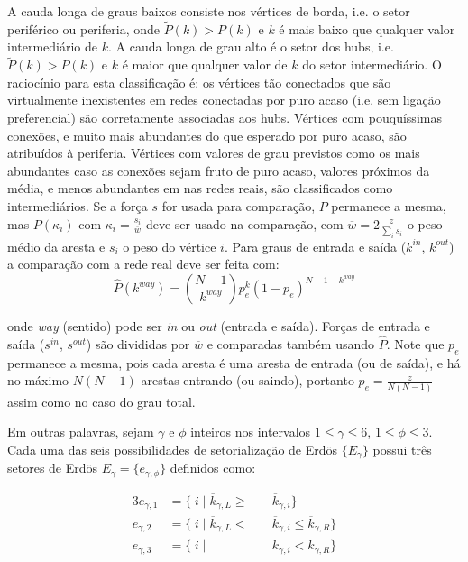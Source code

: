 \documentclass[a4paper,openright,12pt]{report} %
\begin{document}
A cauda longa de graus baixos consiste nos vértices de borda,
i.e. o setor periférico ou periferia, onde
$\widetilde{P}(k)>P(k)$ e $k$ é mais baixo
que qualquer valor intermediário de $k$.
A cauda longa de grau alto é o setor dos hubs,
i.e.
$\widetilde{P}(k)>P(k)$ e $k$ é maior que qualquer valor de $k$ do setor
intermediário.
O raciocínio para esta classificação é: os vértices tão conectados
que são virtualmente inexistentes em redes conectadas por puro acaso
(i.e. sem ligação preferencial) são corretamente associadas
aos hubs.
Vértices com pouquíssimas conexões, e muito mais abundantes do que esperado
por puro acaso, são atribuídos à periferia.
Vértices com valores de grau previstos como os mais abundantes caso
as conexões sejam fruto de puro acaso, valores próximos da média,
e menos abundantes em nas redes reais, são classificados como intermediários.
Se a força $s$ for usada para comparação, $P$ permanece a mesma, mas
$P(\kappa_i)$ com $\kappa_i=\frac{s_i}{\overline{w}}$
deve ser usado na comparação, com
$\overline{w}=2\frac{z}{\sum_is_i}$
o peso médio da aresta e $s_i$ o peso do vértice $i$.
Para graus de entrada e saída
($k^{in}$, $k^{out}$)
a comparação com a rede real deve ser feita com:
\begin{equation}
    \hat{P}(k^{way})=\binom{N-1}{k^{way}}p_e^k(1-p_e)^{N-1-k^{way}}
\end{equation}

\noindent onde \emph{way} (sentido) pode ser \emph{in} ou \emph{out} (entrada e saída).
Forças de entrada e saída ($s^{in}$, $s^{out}$)
são divididas por
$\overline{w}$
e comparadas também usando $\hat{P}$. Note que $p_e$ permanece a mesma,
pois cada aresta é uma aresta de entrada (ou de saída), e há no máximo $N(N-1)$
arestas entrando (ou saindo), portanto
$p_e=\frac{z}{N(N-1)}$
assim como no caso do grau total.

Em outras palavras, sejam $\gamma$ e $\phi$ inteiros nos intervalos
$1 \leq \gamma \leq 6$, $1 \leq \phi \leq 3$.
Cada uma das seis possibilidades de setorialização de Erdös 
$\{E_{\gamma}\}$
possui três setores de Erdös
$E_{\gamma}= \{e_{\gamma, \phi} \}$
definidos como:

\begin{alignat}{3}\label{eq:part}
    e_{\gamma,1}&=\{\;i\;|\;\overline{k}_{\gamma,L}\geq&&\overline{k}_{\gamma,i}\} \nonumber \\
    e_{\gamma,2}&=\{\;i\;|\;\overline{k}_{\gamma,L}<\;&&\overline{k}_{\gamma,i}\leq\overline{k}_{\gamma,R}\} \\ 
    e_{\gamma,3}&=\{\;i\;|\;&&\overline{k}_{\gamma,i}<\overline{k}_{\gamma,R}\} \nonumber
\end{alignat}
\end{document}
